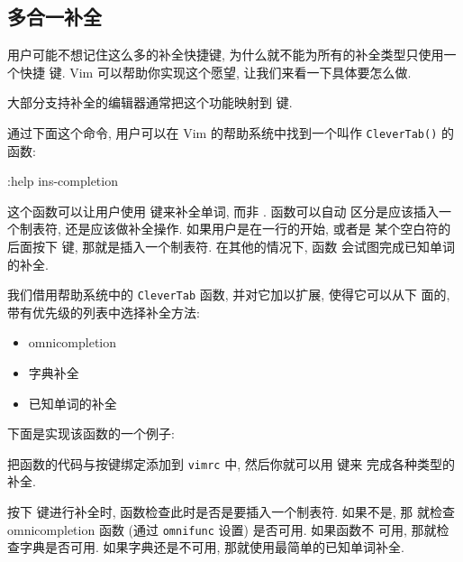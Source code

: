 \subsection{多合一补全}
\label{subsec:all_in_one_completion}

用户可能不想记住这么多的补全快捷键, 为什么就不能为所有的补全类型只使用一个快捷
键. Vim 可以帮助你实现这个愿望, 让我们来看一下具体要怎么做.

大部分支持补全的编辑器通常把这个功能映射到  键.

通过下面这个命令, 用户可以在 Vim 的帮助系统中找到一个叫作
\texttt{CleverTab()} 的函数:
\begin{vimcode}
:help ins-completion
\end{vimcode}
这个函数可以让用户使用  键来补全单词, 而非 . 函数可以自动
区分是应该插入一个制表符, 还是应该做补全操作. 如果用户是在一行的开始, 或者是 
某个空白符的后面按下  键, 那就是插入一个制表符. 在其他的情况下, 函数 
会试图完成已知单词的补全.

我们借用帮助系统中的 \texttt{CleverTab} 函数, 并对它加以扩展, 使得它可以从下
面的, 带有优先级的列表中选择补全方法:
\begin{itemize}
    \item omnicompletion
    \item 字典补全
    \item 已知单词的补全
\end{itemize}
下面是实现该函数的一个例子:

把函数的代码与按键绑定添加到 \texttt{vimrc} 中, 然后你就可以用  键来 
完成各种类型的补全.

按下  键进行补全时, 函数检查此时是否是要插入一个制表符. 如果不是, 那
就检查 omnicompletion 函数 (通过 \texttt{omnifunc} 设置) 是否可用. 如果函数不
可用, 那就检查字典是否可用. 如果字典还是不可用, 那就使用最简单的已知单词补全.

